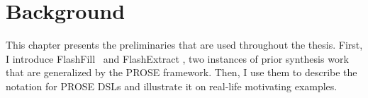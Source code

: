 \chapter{Background}
\label{ch:background}
This chapter presents the preliminaries that are used throughout the thesis.
First, I introduce FlashFill~\cite{flashfill} and FlashExtract \cite{flashextract}, two instances of prior
synthesis work that are generalized by the PROSE framework.
Then, I use them to describe the notation for PROSE DSLs and illustrate it on real-life motivating examples.






